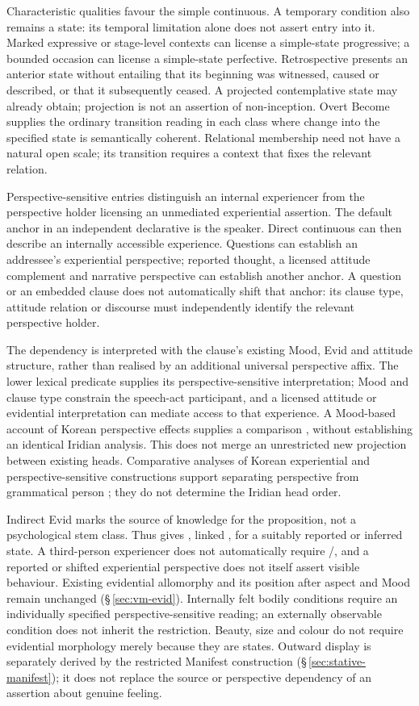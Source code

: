 Characteristic qualities favour the simple continuous. A temporary condition
also remains a state: its temporal limitation alone does not assert entry
into it. Marked expressive or stage-level contexts can license a simple-state
progressive; a bounded occasion can license a simple-state perfective.
Retrospective presents an anterior state without entailing that its beginning
was witnessed, caused or described, or that it subsequently ceased. A projected
contemplative state may already obtain; projection is not an assertion of
non-inception. Overt Become supplies the ordinary
transition reading in each class where change into the specified state is
semantically coherent. Relational membership need not have a natural open
scale; its transition requires a context that fixes the relevant relation.

Perspective-sensitive entries distinguish an internal experiencer from the
perspective holder licensing an unmediated experiential assertion. The default
anchor in an independent declarative is the speaker. Direct continuous
 can then describe an internally accessible experience.
Questions can establish an addressee's experiential perspective; reported
thought, a licensed attitude complement and narrative perspective can establish
another anchor. A question or an embedded clause does not automatically shift
that anchor: its clause type, attitude relation or discourse must independently
identify the relevant perspective holder.

The dependency is interpreted with the clause's existing Mood, Evid and attitude
structure, rather than realised by an additional universal perspective affix.
The lower lexical predicate supplies its perspective-sensitive interpretation;
Mood and clause type constrain the speech-act participant, and a licensed
attitude or evidential interpretation can mediate access to that experience.
A Mood-based account of Korean perspective effects supplies a comparison
\cite{park2026perspective}, without establishing an identical Iridian
analysis. This does not merge an unrestricted new projection between existing heads.
Comparative analyses of Korean experiential and perspective-sensitive
constructions support separating perspective from grammatical person
\cite{nam2024,sakaba2026}; they do not determine the Iridian head order.

Indirect Evid marks the source of knowledge for the proposition, not a
psychological stem class. Thus  gives ,
linked , for a suitably reported or inferred state. A third-person
experiencer does not automatically require /, and a
reported or shifted experiential perspective does not itself assert visible
behaviour. Existing evidential allomorphy and its position after aspect and
Mood remain unchanged (§\,\ref{sec:vm-evid}). Internally felt bodily
conditions require an individually specified perspective-sensitive reading;
an externally observable condition does not inherit the restriction. Beauty,
size and colour do not require evidential morphology merely because they are
states. Outward display is separately derived by the restricted Manifest
construction (§\,\ref{sec:stative-manifest}); it does not replace the source
or perspective dependency of an assertion about genuine feeling.

